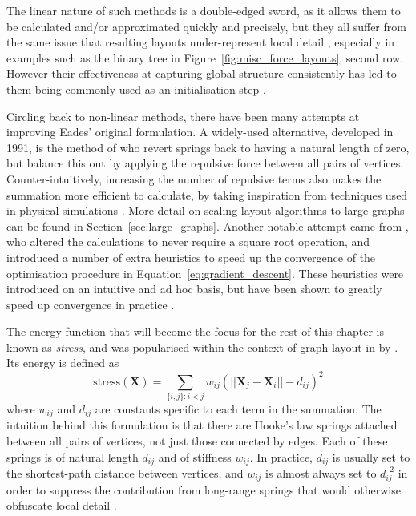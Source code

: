 The linear nature of such methods is a double-edged sword, as it allows them to be calculated and/or approximated quickly and precisely, but they all suffer from the same issue that resulting layouts under-represent local detail \citep{Brandes2008}, especially in examples such as the binary tree in Figure~\ref{fig:misc_force_layouts}, second row. However their effectiveness at capturing global structure consistently has led to them being commonly used as an initialisation step \citep{Brandes2008, Dwyer2009}.

Circling back to non-linear methods, there have been many attempts at improving Eades' original formulation. A widely-used alternative, developed in 1991, is the method of \citet{Fruchterman1991} who revert springs back to having a natural length of zero, but balance this out by applying the repulsive force between all pairs of vertices. Counter-intuitively, increasing the number of repulsive terms also makes the summation more efficient to calculate, by taking inspiration from techniques used in physical simulations \citep{Hachul2004, Hu2005}. More detail on scaling layout algorithms to large graphs can be found in Section~\ref{sec:large_graphs}.
Another notable attempt came from \citet{Frick1995}, who altered the calculations to never require a square root operation, and introduced a number of extra heuristics to speed up the convergence of the optimisation procedure in Equation~\eqref{eq:gradient_descent}. These heuristics were introduced on an intuitive and ad hoc basis, but have been shown to greatly speed up convergence in practice \citep{Brandes2001Physical}.

The energy function that will become the focus for the rest of this chapter is known as \emph{stress}, and was popularised within the context of graph layout in by \citet{Kamada1989}. Its energy is defined as
\begin{equation}
  \mathrm{stress}(\mathbf{X}) = \sum_{\{i,j\}:i<j}w_{ij}(||\mathbf{X}_j-\mathbf{X}_i||-d_{ij})^2
\label{eq:stress}
\end{equation}
where $w_{ij}$ and $d_{ij}$ are constants specific to each term in the summation. The intuition behind this formulation is that there are Hooke's law springs attached between all pairs of vertices, not just those connected by edges. Each of these springs is of natural length $d_{ij}$ and of stiffness $w_{ij}$. In practice, $d_{ij}$ is usually set to the shortest-path distance between vertices, and $w_{ij}$ is almost always set to $d_{ij}^{\text{--}2}$ in order to suppress the contribution from long-range springs that would otherwise obfuscate local detail \citep{Brandes2008}.

